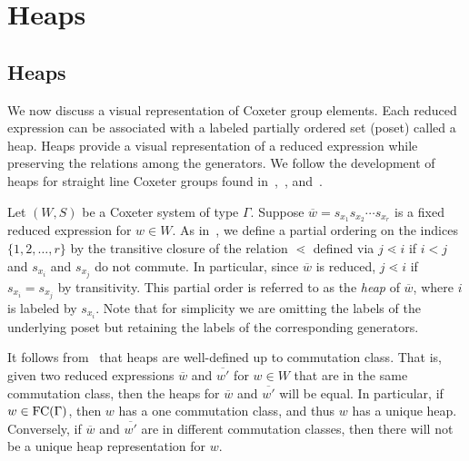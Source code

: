 \chapter{Heaps}

\section{Heaps}\label{sec:Heaps}

We now discuss a visual representation of Coxeter group elements. Each reduced expression can be associated with a labeled partially ordered set (poset) called a heap.  Heaps provide a visual representation of a reduced expression while preserving the relations among the generators. We follow the development of heaps for straight line Coxeter groups found in~\cite{Billey2007},~\cite{Ernst2010}, and~\cite{Stembridge1996}. 

Let $(W,S)$ be a Coxeter system of type $\Gamma$. Suppose $\overline{w}=s_{x_1}s_{x_2}\cdots s_{x_r}$ is a fixed reduced expression for $w \in W$. As in~\cite{Stembridge1996}, we define a partial ordering on the indices $\{1, 2, \ldots, r\}$ by the transitive closure of the relation $\lessdot$ defined via $j \lessdot i$ if $i < j$ and $s_{x_i}$ and $s_{x_j}$ do not commute. In particular, since $\overline{w}$ is reduced, $j \lessdot i$ if $s_{x_i}=s_{x_j}$ by transitivity. This partial order is referred to as the \emph{heap} of $\overline{w}$, where $i$ is labeled by $s_{x_i}$. Note that for simplicity we are omitting the labels of the underlying poset but retaining the labels of the corresponding generators.

It follows from~\cite{Stembridge1996} that heaps are well-defined up to commutation class. That is, given two reduced expressions $\overline{w}$ and $\overline{w'}$ for $w \in W$ that are in the same commutation class, then the heaps for $\overline{w}$ and $\overline{w'}$ will be equal. In particular, if $w \in \mathrm{FC}(\Gamma)$, then $w$ has a one commutation class, and thus $w$ has a unique heap. Conversely, if $\overline{w}$ and $\overline{w'}$ are in different commutation classes, then there will not be a unique heap representation for $w$.

